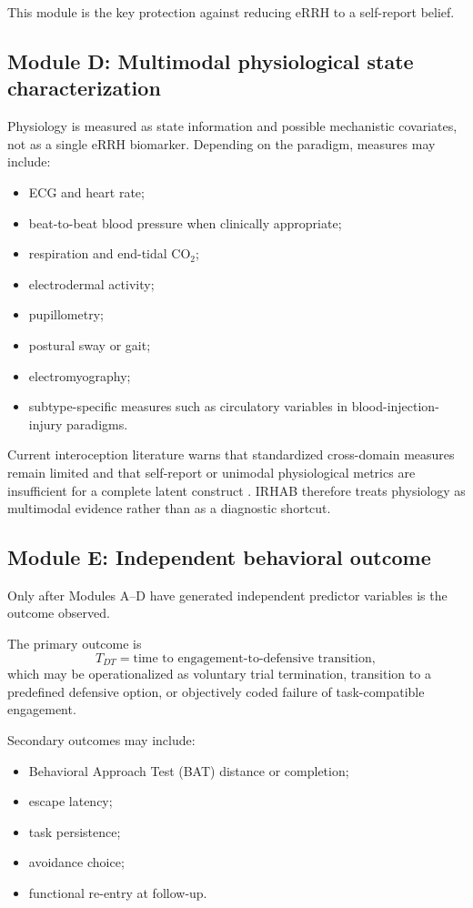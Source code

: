 \documentclass[11pt]{article}
\begin{document}
This module is the key protection against reducing eRRH to a self-report belief.

\subsection{Module D: Multimodal physiological state characterization}
Physiology is measured as state information and possible mechanistic covariates, not as a single eRRH biomarker. Depending on the paradigm, measures may include:
\begin{itemize}[leftmargin=2em]
\item ECG and heart rate;
\item beat-to-beat blood pressure when clinically appropriate;
\item respiration and end-tidal CO$_2$;
\item electrodermal activity;
\item pupillometry;
\item postural sway or gait;
\item electromyography;
\item subtype-specific measures such as circulatory variables in blood-injection-injury paradigms.
\end{itemize}

Current interoception literature warns that standardized cross-domain measures remain limited and that self-report or unimodal physiological metrics are insufficient for a complete latent construct \cite{interotech2023}. IRHAB therefore treats physiology as multimodal evidence rather than as a diagnostic shortcut.

\subsection{Module E: Independent behavioral outcome}
Only after Modules A--D have generated independent predictor variables is the outcome observed.

The primary outcome is
\[
T_{DT}=\text{time to engagement-to-defensive transition},
\]
which may be operationalized as voluntary trial termination, transition to a predefined defensive option, or objectively coded failure of task-compatible engagement.

Secondary outcomes may include:
\begin{itemize}[leftmargin=2em]
\item Behavioral Approach Test (BAT) distance or completion;
\item escape latency;
\item task persistence;
\item avoidance choice;
\item functional re-entry at follow-up.
\end{itemize}
\end{document}
